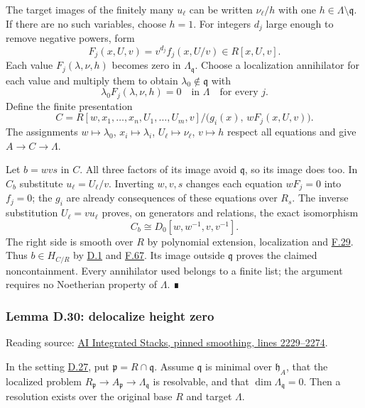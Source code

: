 \documentclass[11pt,a4paper,openany]{report}
\begin{document}
The target images of the finitely many \(u_\ell\) can be written \(\nu_\ell/h\) with one \(h\in\Lambda\setminus\mathfrak q\). If there are no such variables, choose \(h=1\). For integers \(d_j\) large enough to remove negative powers, form \[F_j(x,U,v)=v^{d_j}f_j(x,U/v)\in R[x,U,v].\] Each value \(F_j(\lambda,\nu,h)\) becomes zero in \(\Lambda_{\mathfrak q}\). Choose a localization annihilator for each value and multiply them to obtain \(\lambda_0\notin\mathfrak q\) with \[\lambda_0 F_j(\lambda,\nu,h)=0\quad\text{in }\Lambda\quad\text{for every }j.\] Define the finite presentation \[C=R[w,x_1,\ldots,x_n,U_1,\ldots,U_m,v]/
\bigl(g_i(x),\,wF_j(x,U,v)\bigr).\] The assignments \(w\mapsto\lambda_0\), \(x_i\mapsto\lambda_i\), \(U_\ell\mapsto\nu_\ell\), \(v\mapsto h\) respect all equations and give \(A\to C\to\Lambda\).

Let \(b=wvs\) in \(C\). All three factors of its image avoid \(\mathfrak q\), so its image does too. In \(C_b\) substitute \(u_\ell=U_\ell/v\). Inverting \(w,v,s\) changes each equation \(wF_j=0\) into \(f_j=0\); the \(g_i\) are already consequences of these equations over \(R_s\). The inverse substitution \(U_\ell=vu_\ell\) proves, on generators and relations, the exact isomorphism \[C_b\cong D_0[w,w^{-1},v,v^{-1}].\] The right side is smooth over \(R\) by polynomial extension, localization and \hyperref[AG-RG-S05-algebra-lemma-compose-smooth]{F.29}. Thus \(b\in H_{C/R}\) by \hyperref[AG-RG-S05-smoothing-definition-singular-ideal]{D.1} and \hyperref[AG-RG-S05-algebra-lemma-locally-smooth]{F.67}. Its image outside \(\mathfrak q\) proves the claimed noncontainment. Every annihilator used belongs to a finite list; the argument requires no Noetherian property of \(\Lambda\). ∎

\label{AG-RG-S05-smoothing-lemma-delocalize-height-zero}

\subsubsection{Lemma D.30: delocalize height zero}\label{AG-RG-S05-lemma-d.30-delocalize-height-zero}

Reading source: \href{https://github.com/KokunoYumeto/unofficial-stacks-project-ai-drafts/blob/565b10e987aba5969b21145a0833f42d69f96790/smoothing.tex\#L2229-L2274}{AI Integrated Stacks, pinned smoothing, lines 2229--2274}.

In the setting \hyperref[AG-RG-S05-smoothing-situation-local]{D.27}, put \(\mathfrak p=R\cap\mathfrak q\). Assume \(\mathfrak q\) is minimal over \(\mathfrak h_A\), that the localized problem \(R_{\mathfrak p}\to A_{\mathfrak p}\to\Lambda_{\mathfrak q}\) is resolvable, and that \(\dim\Lambda_{\mathfrak q}=0\). Then a resolution exists over the original base \(R\) and target \(\Lambda\).
\end{document}
